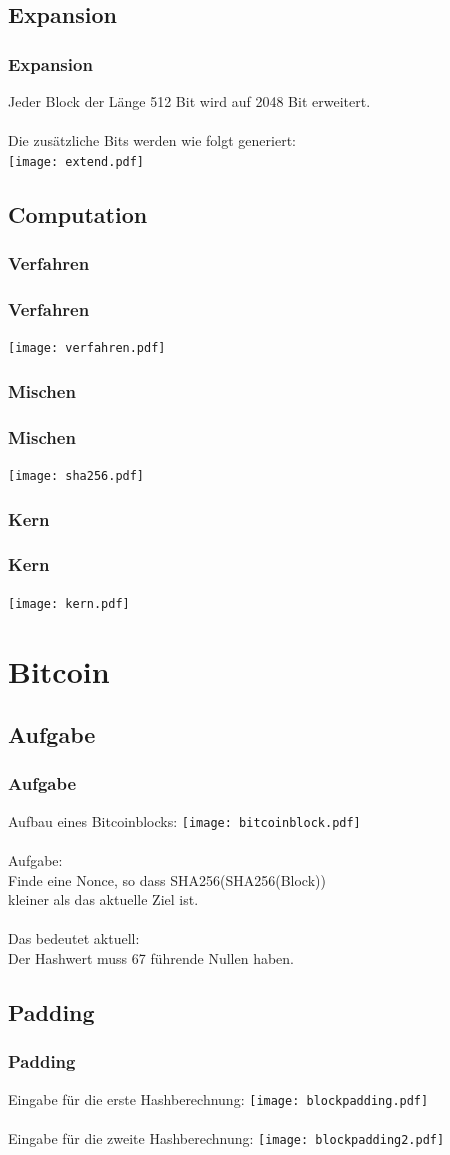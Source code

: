\documentclass{beamer}
\begin{document}
\subsection{Expansion}
  \begin{frame}
    \frametitle{Expansion}
    Jeder Block der Länge 512 Bit wird auf 2048 Bit erweitert.\\
    ~\\
    Die zusätzliche Bits werden wie folgt generiert:\\
    \texttt{[image: extend.pdf]}
  \end{frame}
\subsection{Computation}
\subsubsection{Verfahren}
  \begin{frame}
    \frametitle{Verfahren}
    \texttt{[image: verfahren.pdf]}
  \end{frame}
\subsubsection{Mischen}
  \begin{frame}
    \frametitle{Mischen}
    \texttt{[image: sha256.pdf]}
  \end{frame}
\subsubsection{Kern}
  \begin{frame}
    \frametitle{Kern}
    \texttt{[image: kern.pdf]}
  \end{frame}
\section{Bitcoin}
\subsection{Aufgabe}
  \begin{frame}
    \frametitle{Aufgabe}
    Aufbau eines Bitcoinblocks:
    \texttt{[image: bitcoinblock.pdf]}\\
    ~\\
    Aufgabe:\\
    Finde eine Nonce, so dass SHA256(SHA256(Block))\\
    kleiner als das aktuelle Ziel ist.\\
    ~\\
    Das bedeutet aktuell:\\
    Der Hashwert muss 67 führende Nullen haben.
  \end{frame}
\subsection{Padding}
  \begin{frame}
    \frametitle{Padding}
    Eingabe für die erste Hashberechnung:
    \texttt{[image: blockpadding.pdf]}\\
    ~\\
    Eingabe für die zweite Hashberechnung:
    \texttt{[image: blockpadding2.pdf]}\\
  \end{frame}
\end{document}
